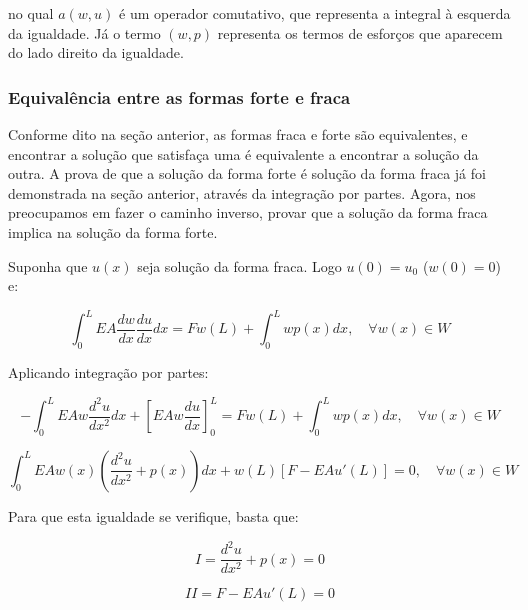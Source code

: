         \noindent no qual $a(w,u)$ é um operador comutativo, que representa a integral à esquerda da igualdade. Já o termo $(w,p)$ representa os termos de esforços que aparecem do lado direito da igualdade.

        \subsubsection*{Equivalência entre as formas forte e fraca}

        Conforme dito na seção anterior, as formas fraca e forte são equivalentes, e encontrar a solução que satisfaça uma é equivalente a encontrar a solução da outra. A prova de que a solução da forma forte é solução da forma fraca já foi demonstrada na seção anterior, através da integração por partes. Agora, nos preocupamos em fazer o caminho inverso, provar que a solução da forma fraca implica na solução da forma forte.

        Suponha que $u(x)$ seja solução da forma fraca. Logo $u(0) = u_0$ ($w(0) = 0$) e:

        \begin{equation*}
            \int_0^L EA \frac{dw}{dx} \frac{du}{dx} dx  = F w(L) + \int_0^Lwp(x) dx , \quad \forall w(x) \in W
        \end{equation*}

        Aplicando integração por partes:

        \begin{equation*}
            -\int_0^L EA w \frac{d^2u}{dx^2} dx +  \left[EA w \frac{du}{dx}\right]_0^L = F w(L) + \int_0^Lwp(x) dx , \quad \forall w(x) \in W
        \end{equation*}

        \begin{equation*}
            \int_0^L EA w(x) \left(\frac{d^2u}{dx^2} + p(x)\right) dx +  w(L)\left[F - EAu'(L) \right] = 0 , \quad \forall w(x) \in W
            \label{eq:fraca_igual_forte}
        \end{equation*}

        Para que esta igualdade se verifique, basta que:

        \begin{equation*}
            I = \frac{d^2u}{dx^2} + p(x) = 0
        \end{equation*}

        \begin{equation*}
            II = F - EA u'(L) = 0
        \end{equation*}

